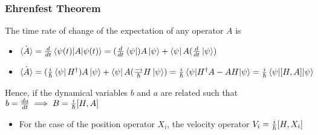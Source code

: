 \documentclass[8pt,t,mathserif,aspectratio=169]{beamer}
\begin{document}
\begin{frame}
  \frametitle{Ehrenfest Theorem}
  \vspace{1mm}
  The time rate of change of the expectation of any operator $A$ is
  \begin{itemize}
    \item $\dot{\expval{A}} = {d \over dt} \expval{A}{\psi(t)} = ({d \over dt} \bra{\psi}) A \ket{\psi} + \bra{\psi} A ({d \over dt} \ket{\psi})$
    \item $\dot{\expval{A}} = ({i \over \hbar} \bra{\psi} H^{\dagger}) A \ket{\psi} + \bra{\psi} A ({-i \over \hbar} H \ket{\psi}) = {i \over \hbar} \expval {H^{\dagger} A - A H}{\psi} = {i \over \hbar} \expval {[H,A]}{\psi}$
  \end{itemize}
  Hence, if the dynamical variables $b$ and $a$ are related such that $b = {da \over dt} \implies B = {i \over \hbar} [H,A]$
  \begin{itemize}
    \item For the case of the position operator $X_i$, the velocity operator $V_i = {i \over \hbar} [H,X_i]$
  \end{itemize}
\end{frame}
\end{document}
